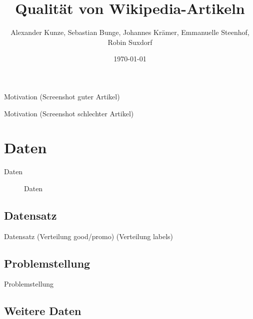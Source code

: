 \documentclass[aspectratio=169]{beamer} %
\title{Qualität von Wikipedia-Artikeln}
\author[]{Alexander Kunze, Sebastian Bunge, Johannes Krämer, Emmanuelle Steenhof, Robin Suxdorf}
\institute{Artificial Intelligence Group,\\
University of Hagen, Germany}
\date{\today}
\begin{document}




\begin{frame}
    \titlepage
\end{frame}
\nologo

\begin{frame}{Motivation}
    (Screenshot guter Artikel)
\end{frame}

\begin{frame}{Motivation}
    (Screenshot schlechter Artikel)
\end{frame}

\section{Daten}

\begin{frame}{Daten}
    \begin{figure}
        Daten
    \end{figure}
\end{frame}

\subsection{Datensatz}

\begin{frame}{Datensatz}
    (Verteilung good/promo)
    (Verteilung labels)
\end{frame}

\subsection{Problemstellung}

\begin{frame}{Problemstellung}
    
\end{frame}

\subsection{Weitere Daten}
\end{document}
